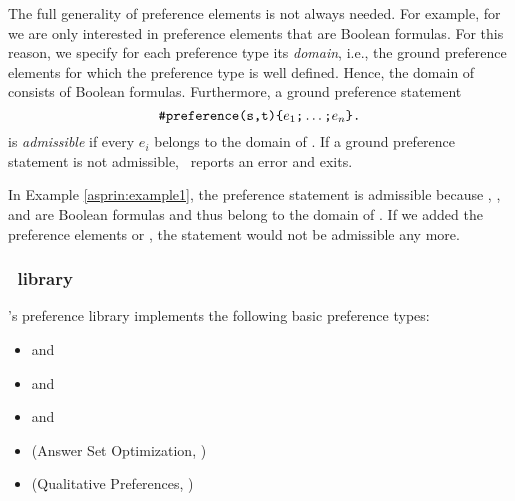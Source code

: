 The full generality of preference elements is not always needed.
%
For example, for  we are only interested in preference elements that are Boolean formulas.
For this reason, we specify for each preference type its \emph{domain}, 
i.e., the ground preference elements for which the preference type is well defined.
Hence, the domain of  consists of Boolean formulas.
Furthermore, a ground preference statement
\[\texttt{\#preference(s,t)\{}e_1\texttt{;}\dots\texttt{;}e_n\texttt{\}.}\]
is \emph{admissible} if every ${e}_i$ belongs to the domain of .
If a ground preference statement is not admissible, \asprin\ reports an error and exits. 
\begin{example}
In Example \ref{asprin:example1}, the preference statement   
is admissible because , , and  are Boolean formulas
and thus belong to the domain of . 
If we added the preference elements  or , 
the statement would not be admissible any more.
\end{example}

\subsubsection{\asprin\ library}
\asprin's preference library implements the following basic preference types:
\begin{itemize}
	\item  {} and    
	\item  {} and    
	\item  {} and    
	\item  {}   (Answer Set Optimization, \cite{brnitr03a})   
	\item  {} (Qualitative Preferences, \cite{rogima10a})  
\end{itemize}

